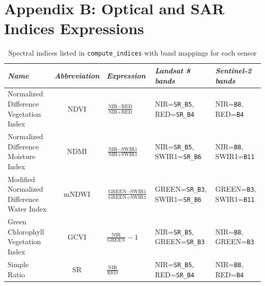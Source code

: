 \documentclass[final-report]{report-template}
\begin{document}
\section{Appendix B: Optical and SAR Indices Expressions}
\begin{table}[htbp]
    \centering
    \caption{Spectral indices listed in \texttt{compute\_indices} with band mappings for each sensor}
    \label{tab:optical-indices}
    \renewcommand{\arraystretch}{1.3}
    \begin{tabularx}{\textwidth}{L c >{\hsize}L >{\hsize}L >{\hsize}L}
    \toprule
    \textit{Name} & \textit{Abbreviation} & \textit{Expression} & \textit{Landsat 8 bands} & \textit{Sentinel-2 bands} \\
    \midrule
        Normalized Difference Vegetation Index & NDVI & $\frac{\text{NIR} - \text{RED}}{\text{NIR} + \text{RED}}$ & {\scriptsize NIR=\texttt{SR\_B5}, RED=\texttt{SR\_B4}} & {\scriptsize NIR=\texttt{B8}, RED=\texttt{B4}} \\
        \addlinespace
        Normalized Difference Moisture Index & NDMI  & $\frac{\text{NIR} - \text{SWIR1}}{\text{NIR} + \text{SWIR1}}$ & {\scriptsize NIR=\texttt{SR\_B5}, SWIR1=\texttt{SR\_B6}} & {\scriptsize NIR=\texttt{B8}, SWIR1=\texttt{B11}} \\
        \addlinespace
        Modified Normalized Difference Water Index & mNDWI & $\frac{\text{GREEN} - \text{SWIR1}}{\text{GREEN} + \text{SWIR1}}$ & {\scriptsize GREEN=\texttt{SR\_B3}, SWIR1=\texttt{SR\_B6}} & {\scriptsize GREEN=\texttt{B3}, SWIR1=\texttt{B11}} \\
        \addlinespace
        Green Chlorophyll Vegetation Index & GCVI  & $\frac{\text{NIR}}{\text{GREEN}} - 1$ & {\scriptsize NIR=\texttt{SR\_B5}, GREEN=\texttt{SR\_B3}} & {\scriptsize NIR=\texttt{B8}, GREEN=\texttt{B3}} \\
        \addlinespace
        Simple Ratio & SR    & $\frac{\text{NIR}}{\text{RED}}$ & {\scriptsize NIR=\texttt{SR\_B5}, RED=\texttt{SR\_B4}} & {\scriptsize NIR=\texttt{B8}, RED=\texttt{B4}} \\
        \bottomrule
    \end{tabularx}
\end{table}
\vspace{6 mm}
\end{document}
